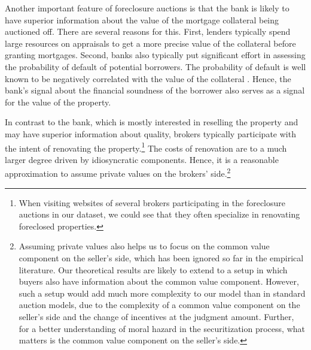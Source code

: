 \documentclass[11pt,twopage]{article}
\newcommand{\AN}[1]{\textcolor{red}{[AN: #1]}}
\begin{document}
Another important feature of foreclosure auctions is that the bank is
likely to have superior information about the value of the mortgage
collateral being auctioned off. There are several reasons for
this. First, lenders typically spend large resources on appraisals to
get a more precise value of the collateral before granting
mortgages. %
Second, banks also typically put
significant effort in assessing the probability of default of
potential borrowers. The probability of default is well known to be
negatively correlated with the value of the collateral \cite[see][and the references therein]{qi2009loss}. Hence, the bank's signal about
the financial soundness of the borrower also serves as a signal for
the value of the property.

In contrast to the bank, which is mostly interested in reselling the
property and may have superior information about quality, brokers
typically participate with the intent of renovating the
property.\footnote{When visiting websites of several brokers
  participating in the foreclosure auctions in our dataset, we could
  see that they often specialize in renovating foreclosed properties.}
The costs of renovation are to a much larger degree driven by
idiosyncratic components. Hence, it is a reasonable approximation to
assume private values on the brokers' side.\footnote{Assuming private
  values also helps us to focus on the common value component on the
  seller's side, which has been ignored so far in the empirical
  literature. Our theoretical results are likely to extend to a setup
  in which buyers also have information about the common value
  component. However, such a setup would add much more complexity to
  our model than in standard auction models, due to the complexity of
  a common value component on the seller's side and the change of
  incentives at the judgment amount. Further, for a better
  understanding of moral hazard in the securitization process, what
  matters is the common value component on the seller's side.}

\end{document}
